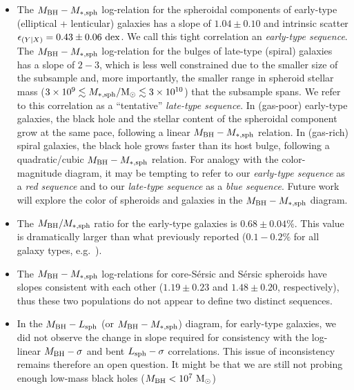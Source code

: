 \documentclass[preprint2]{emulateapj}
\begin{document}
\begin{itemize}
\item The $M_{\rm BH} - M_{\rm *,sph}$ log-relation for the spheroidal components of early-type (elliptical + lenticular) galaxies 
      has a slope of $1.04 \pm 0.10$ and intrinsic scatter $\epsilon_{(Y|X)} = 0.43 \pm 0.06\rm~dex$. 
      We call this tight correlation an \emph{early-type sequence}. 
      The $M_{\rm BH} - M_{\rm *,sph}$ log-relation for the bulges of late-type (spiral) galaxies has a slope of $2-3$,
      which is less well constrained due to
      the smaller size of the subsample and, more importantly, the smaller range in spheroid stellar mass 
      ($3 \times 10^9 \lesssim M_{\rm *,sph}/{\rm M_\odot} \lesssim 3 \times 10^{10}$) that the subsample spans. 
      We refer to this correlation as a ``tentative'' \emph{late-type sequence}. 
      In (gas-poor) early-type galaxies, the black hole and the stellar content of the spheroidal component grow at the same pace, 
      following a linear $M_{\rm BH} - M_{\rm *,sph}$ relation. 
      In (gas-rich) spiral galaxies, the black hole grows faster than its host bulge, 
      following a quadratic/cubic $M_{\rm BH} - M_{\rm *,sph}$ relation. 
      For analogy with the color-magnitude diagram, 
      it may be tempting to refer to our \emph{early-type sequence} as a \emph{red sequence} 
      and to our \emph{late-type sequence} as a \emph{blue sequence}.
      Future work will explore the color of spheroids and galaxies in the $M_{\rm BH} - M_{\rm *,sph}$ diagram.  
\item The $M_{\rm BH}/M_{\rm *,sph}$ ratio for the early-type galaxies is $0.68 \pm 0.04\%$. 
      This value is dramatically larger than what previously reported ($0.1 - 0.2\%$ for all galaxy types, e.g.~\citealt{marconihunt2003}).
\item The $M_{\rm BH} - M_{\rm *,sph}$ log-relations for core-S\'ersic and S\'ersic spheroids have slopes consistent with each other 
      ($1.19 \pm 0.23$ and $1.48 \pm 0.20$, respectively), 
      thus these two populations do not appear to define two distinct sequences. 
\item In the $M_{\rm BH} - L_{\rm sph}$ (or $M_{\rm BH} - M_{\rm *,sph}$) diagram, for early-type galaxies, 
      we did not observe the change in slope required for consistency with the log-linear $M_{\rm BH} - \sigma$ and bent $L_{\rm sph} - \sigma$ correlations.
      This issue of inconsistency remains therefore an open question. 
      It might be that we are still not probing enough low-mass black holes ($M_{\rm BH} < 10^7\rm~M_\odot$) 

\end{itemize}
\end{document}

